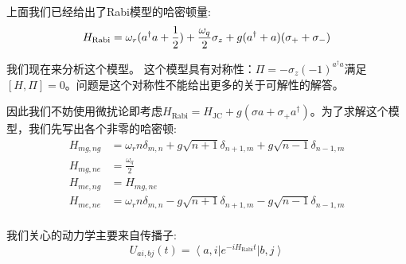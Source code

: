 \documentclass[supercite]{HustGraduPaper}
\newcommand{\bra}[1]{\left\langle #1 \right|}
\newcommand{\ket}[1]{\left| #1 \right\rangle}
\begin{document}
	   上面我们已经给出了Rabi模型的哈密顿量:
	   	   \begin{equation}
	   H_{\text{Rabi}} = \omega_r (a^\dagger a + { 1\over 2}) + \frac{\omega_q}{2} \sigma_z + g(a^\dagger + a)(\sigma_+ + \sigma_-)
	   \end{equation}
	   
	   我们现在来分析这个模型。 这个模型具有对称性：$\Pi = -\sigma_z (-1)^{a^\dagger a}$满足$[H,\Pi] = 0$。问题是这个对称性不能给出更多的关于可解性的解答。
	   
	   因此我们不妨使用微扰论即考虑$H_{\text{Rabi}} = H_{\text{JC}} + g( \sigma a+ \sigma_+ a^\dagger)$。为了求解这个模型，我们先写出各个非零的哈密顿: 
	   \begin{equation}
	   \begin{aligned}
	   H_{mg,ng} &={\omega_r n{\delta _{m,n}} + g \sqrt {n + 1} {\delta _{n + 1,m}} +g \sqrt {n - 1} {\delta _{n - 1,m}}}\\ 
	   H_{mg,ne} &= \frac{\omega_q}{2}\\
	   H_{me,ng} &= H_{mg,ne}\\
	   H_{me,ne} &={\omega_r n{\delta _{m,n}} - g \sqrt {n + 1} {\delta _{n + 1,m}} - g \sqrt {n - 1} {\delta _{n - 1,m}}}\\
	   \end{aligned}
	   \end{equation}
	  
我们关心的动力学主要来自传播子:
\begin{equation}
U_{ai, bj} (t)= \bra{a,i } e^{-iH_{\text{Rabi}}t} \ket{b,j}
\end{equation}
\end{document}
